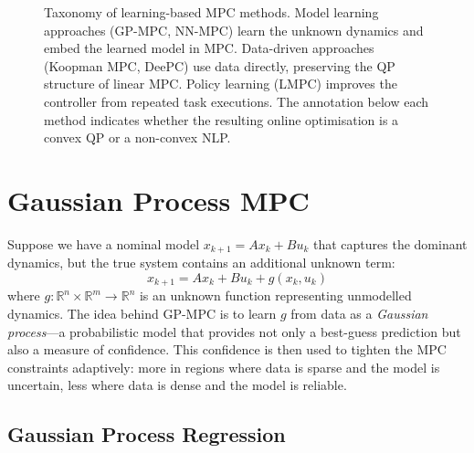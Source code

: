 \begin{figure}[ht]
{%
	}
	\caption{Taxonomy of learning-based MPC methods. Model learning approaches (GP-MPC, NN-MPC) learn the unknown dynamics and embed the learned model in MPC. Data-driven approaches (Koopman MPC, DeePC) use data directly, preserving the QP structure of linear MPC. Policy learning (LMPC) improves the controller from repeated task executions. The annotation below each method indicates whether the resulting online optimisation is a convex QP or a non-convex NLP.}
	\label{fig:learning_taxonomy}
\end{figure}


\section{Gaussian Process MPC}
\label{sec:gpmpc}

Suppose we have a nominal model $x_{k+1} = Ax_k + Bu_k$ that captures the dominant dynamics, but the true system contains an additional unknown term:
\begin{equation}\label{eq:residual_model}
	x_{k+1} = Ax_k + Bu_k + g(x_k, u_k)
\end{equation}
where $g \colon \mathbb{R}^n \times \mathbb{R}^m \to \mathbb{R}^n$ is an unknown function representing unmodelled dynamics. The idea behind GP-MPC is to learn $g$ from data as a \emph{Gaussian process}---a probabilistic model that provides not only a best-guess prediction but also a measure of confidence. This confidence is then used to tighten the MPC constraints adaptively: more in regions where data is sparse and the model is uncertain, less where data is dense and the model is reliable.

\subsection{Gaussian Process Regression}
\label{sec:gp_regression}

